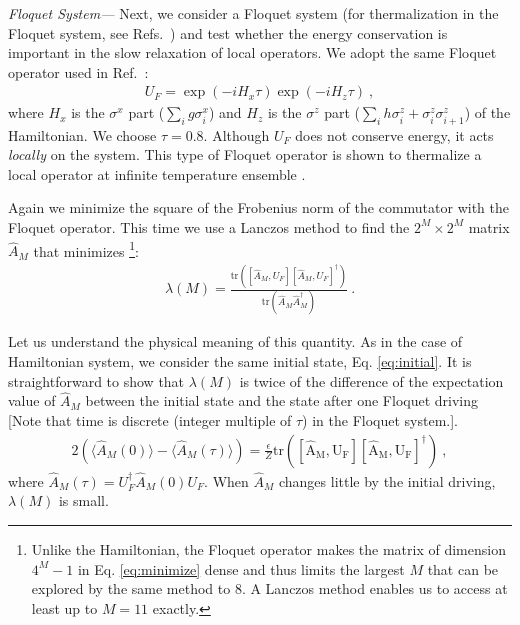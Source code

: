 \documentclass[twocolumn,superscriptaddress, prb]{revtex4-1}
\begin{document}
{\it Floquet System---}
Next, we consider a Floquet system (for thermalization in the Floquet system, see Refs.~) and test whether the energy conservation is important in the slow relaxation of local operators.
We adopt the same Floquet operator used in Ref.~:
\begin{align}
U_F = \exp(-i H_x \tau) \exp(-i H_z \tau) ~,
\label{eq:floquet_op}
\end{align}
where $H_x$ is the $\sigma^x$ part ($\sum_i g \sigma^x_i$) and $H_z$ is the $\sigma^z$ part ($\sum_i h \sigma^z_i +\sigma^z_i \sigma^z_{i+1}$)
of the Hamiltonian. We choose $\tau = 0.8$.
Although $U_F$ does not conserve energy, it acts {\it locally} on the system.
This type of Floquet operator is shown to thermalize a local operator at infinite temperature ensemble \cite{Kim_ETH,Prosen:2002}.

Again we minimize the square of the Frobenius norm of the commutator with the Floquet operator.
This time we use a Lanczos method to find the $2^M \times 2^M$ matrix $\hat{A}_M$
that minimizes \footnote{Unlike the Hamiltonian, the Floquet operator makes the matrix of dimension $4^M-1$ in Eq. \eqref{eq:minimize} dense and thus
limits the largest $M$ that can be explored by the same method to 8. A Lanczos method enables us to access at least up to $M = 11$ exactly.}:
\begin{align}\label{eq:floquet_minimize}
\lambda(M) = \frac{\mathrm{tr}([\hat{A}_M,U_F][\hat{A}_M,U_F]^\dag)}{\mathrm{tr}(\hat{A}_M\hat{A}_M^\dag)} ~.
\end{align}

Let us understand the physical meaning of this quantity.
As in the case of Hamiltonian system, we consider the same initial state, Eq. \eqref{eq:initial}.
It is straightforward to show that $\lambda(M)$ is twice of the
difference of the expectation value of $\hat{A}_M$ between the initial state and the state after one Floquet driving
[Note that time is discrete (integer multiple of $\tau$) in the Floquet system.].
\begin{align}
2\left(\langle \hat{A}_M(0) \rangle - \langle \hat{A}_M(\tau) \rangle \right) = \frac{\epsilon}{Z}\mathrm{tr([\hat{A}_M,U_F][\hat{A}_M,U_F]^\dag)} ~,
\end{align}
where $\hat{A}_M(\tau) = U_F^\dag \hat{A}_M(0) U_F$.
When $\hat{A}_M$ changes little by the initial driving, $\lambda(M)$ is small. %
\end{document}
